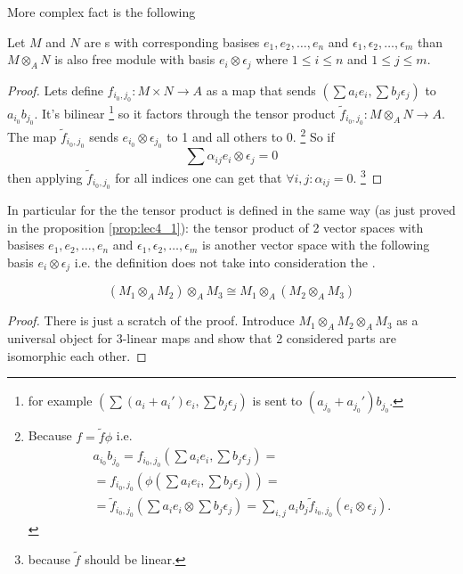 More complex fact is the following
\begin{proposition}
  Let $M$ and $N$ are s
  with corresponding basises $e_1, e_2, \dots, e_n$ and
  $\epsilon_1, \epsilon_2, \dots, \epsilon_m$ than
  $M \otimes_A N$ is also free module with basis $e_i \otimes
  \epsilon_j$ where $1 \le i \le n$ and
  $1 \le j \le m$.
  \begin{proof}
    Lets define
    $f_{i_0,j_0}: M \times N \to A$ as a map that sends
    $\left(\sum a_i e_i, \sum b_j \epsilon_j\right)$ to
    $a_{i_0} b_{j_0}$. It's bilinear
    \footnote{
      for example
      $\left(\sum (a_i + a_i') e_i, \sum b_j \epsilon_j\right)$ is
      sent to  $(a_{j_0} + a_{j_0}') b_{j_0}$.
    }
    so it factors through the tensor product
    $\tilde{f}_{i_0, j_0} : M \otimes_A N \to A$. The map
    $\tilde{f}_{i_0, j_0}$ sends $e_{i_0} \otimes \epsilon_{j_0}$ to 1
    and all others to 0.
    \footnote{
      Because $f = \tilde{f} \phi$ i.e.
      \begin{eqnarray}
      a_{i_0} b_{j_0} =
      f_{i_0,j_0}\left(\sum a_i e_i, \sum b_j\epsilon_j\right) =
      \nonumber \\
      =  f_{i_0,j_0}\left(
      \phi\left(\sum a_i e_i, \sum b_j\epsilon_j\right)\right) = 
      \nonumber \\
      =
      \tilde{f}_{i_0,j_0}\left(\sum a_i e_i \otimes \sum b_j
      \epsilon_j\right) =
      \sum_{i,j} a_i b_j \tilde{f}_{i_0,j_0}(e_i \otimes \epsilon_j).
      \nonumber
      \end{eqnarray}
    }
    So if
    \[
    \sum \alpha_{ij} e_i \otimes \epsilon_j = 0
    \]
    then applying $\tilde{f}_{i_0, j_0}$ for all indices one can get
    that $\forall i,j: \alpha_{ij} = 0$.
    \footnote{
      because $\tilde{f}$ should be linear.
    }
  \end{proof}
  \label{prop:lec4_1}
\end{proposition}

In particular for the  the tensor product is
defined in the same way (as just proved in the proposition
\ref{prop:lec4_1}): the tensor product of 2 vector spaces with
basises $e_1, e_2, \dots, e_n$ and
$\epsilon_1, \epsilon_2, \dots, \epsilon_m$ is another vector space
with the following basis $e_i \otimes \epsilon_j$ i.e. the definition
does not take into consideration the .

\begin{proposition}[Associative]
  \[
  \left(M_1 \otimes_A M_2\right) \otimes_A M_3
  \cong
  M_1 \otimes_A \left(M_2 \otimes_A M_3\right)
  \]
  \begin{proof}
    There is just a scratch of the proof.
    Introduce
    $M_1 \otimes_A M_2 \otimes_A M_3$
    as a universal object for 3-linear maps and show that 2 considered
    parts are isomorphic each other.
  \end{proof}
  \label{prop:lec4_Associative}
\end{proposition}

